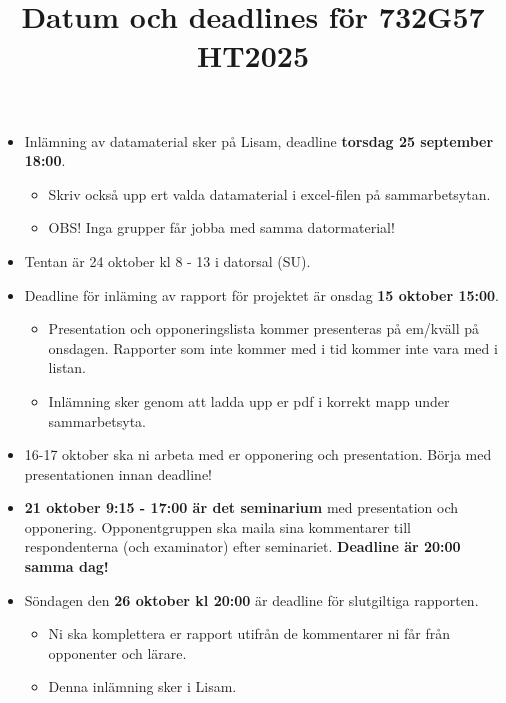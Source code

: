 \documentclass[a4paper]{article}
\title{Datum och deadlines för 732G57 HT2025}
\author{}
\date{}
\begin{document}
\maketitle
\thispagestyle{fancy}

\begin{itemize}
    \item Inlämning av datamaterial sker på Lisam, deadline \textbf{torsdag 25 september 18:00}.
    \begin{itemize}
        \item Skriv också upp ert valda datamaterial i excel-filen på sammarbetsytan.
        \item OBS! Inga grupper får jobba med samma datormaterial!
    \end{itemize}
    \item Tentan är 24 oktober kl 8 - 13 i datorsal (SU).
    \item Deadline för inläming av rapport för projektet är onsdag \textbf{15 oktober 15:00}.
    \begin{itemize}
        \item Presentation och opponeringslista kommer presenteras på em/kväll på onsdagen. 
        Rapporter som inte kommer med i tid kommer inte vara med i listan.
        \item Inlämning sker genom att ladda upp er pdf i korrekt mapp under sammarbetsyta.
    \end{itemize}
    \item 16-17 oktober ska ni arbeta med er opponering och presentation. Börja med presentationen
    innan deadline!
    \item \textbf{21 oktober 9:15 - 17:00 är det seminarium} med presentation och opponering.
    Opponentgruppen ska maila sina kommentarer till respondenterna (och examinator) efter 
    seminariet. \textbf{Deadline är 20:00 samma dag!}
    \item Söndagen den \textbf{26 oktober kl 20:00} är deadline för slutgiltiga rapporten.
    \begin{itemize}
        \item Ni ska komplettera er rapport utifrån de kommentarer ni får från opponenter och lärare.
        \item Denna inlämning sker i Lisam.
    \end{itemize}
\end{itemize}
\end{document}
